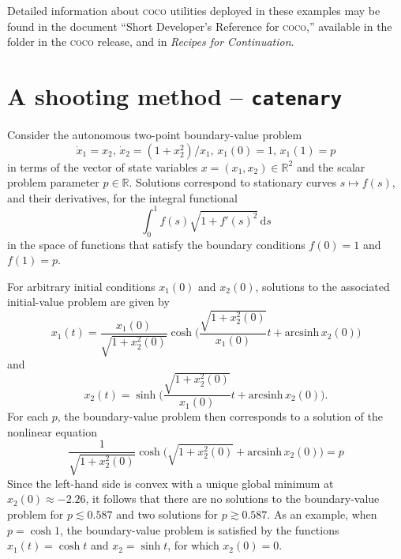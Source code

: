 Detailed information about \textsc{coco} utilities deployed in these examples may be found in the document ``Short Developer's Reference for \textsc{coco},'' available in the  folder in the \textsc{coco} release, and in \emph{Recipes for Continuation}.

\section{A shooting method -- \texttt{catenary}}
Consider the autonomous two-point boundary-value problem
\begin{equation}
\dot{x}_1=x_2,\,\dot{x}_2=(1+x_2^2)/x_1,\,x_1(0)=1,\,x_1(1)=p
\end{equation}
in terms of the vector of state variables $x=(x_1,x_2)\in\mathbb{R}^2$ and the scalar problem parameter $p\in\mathbb{R}$. Solutions correspond to stationary curves $s\mapsto f(s)$, and their derivatives, for the integral functional
\begin{equation}
\int_0^1 f(s)\sqrt{1+f'(s)^2}\,\mathrm{d}s
\end{equation}
in the space of functions that satisfy the boundary conditions $f(0)=1$ and $f(1)=p$.

For arbitrary initial conditions $x_1(0)$ and $x_2(0)$, solutions to the associated initial-value problem are given by
\begin{equation}
x_1(t)=\frac{x_1(0)}{\sqrt{1+x_2^2(0)}}\cosh\bigg(\frac{\sqrt{1+x_2^2(0)}}{x_1(0)}t+\mathrm{arcsinh}\, x_2(0)\bigg)
\end{equation}
and
\begin{equation}
x_2(t)=\sinh\bigg(\frac{\sqrt{1+x_2^2(0)}}{x_1(0)}t+\mathrm{arcsinh}\, x_2(0)\bigg).
\end{equation}
For each $p$, the boundary-value problem then corresponds to a solution of the nonlinear equation
\begin{equation}
\frac{1}{\sqrt{1+x_2^2(0)}}\cosh\bigg(\sqrt{1+x_2^2(0)}+\mathrm{arcsinh}\, x_2(0)\bigg)=p
\end{equation}
Since the left-hand side is convex with a unique global minimum at $x_2(0)\approx-2.26$, it follows that there are no solutions to the boundary-value problem for $p\lesssim 0.587$ and two solutions for $p\gtrsim 0.587$. As an example, when $p=\cosh 1$, the boundary-value problem is satisfied by the functions $x_1(t)=\cosh t$ and $x_2=\sinh t$, for which $x_2(0)=0$.

